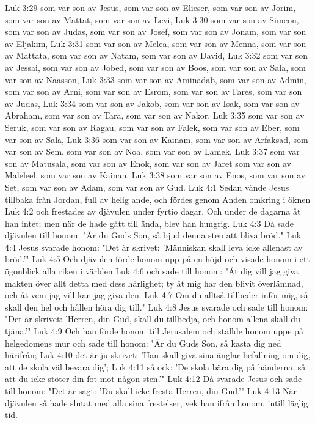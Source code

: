 Luk 3:29  som var son av Jesus, som var son av Elieser, som var son av Jorim, som var son av Mattat, som var son av Levi,
Luk 3:30  som var son av Simeon, som var son av Judas, som var son av Josef, som var son av Jonam, som var son av Eljakim,
Luk 3:31  som var son av Melea, som var son av Menna, som var son av Mattata, som var son av Natam, som var son av David,
Luk 3:32  som var son av Jessai, som var son av Jobed, som var son av Boos, som var son av Sala, som var son av Naasson,
Luk 3:33  som var son av Aminadab, som var son av Admin, som var son av Arni, som var son av Esrom, som var son av Fares, som var son av Judas,
Luk 3:34  som var son av Jakob, som var son av Isak, som var son av Abraham, som var son av Tara, som var son av Nakor,
Luk 3:35  som var son av Seruk, som var son av Ragau, som var son av Falek, som var son av Eber, som var son av Sala,
Luk 3:36  som var son av Kainam, som var son av Arfaksad, som var son av Sem, som var son av Noa, som var son av Lamek,
Luk 3:37  som var son av Matusala, som var son av Enok, som var son av Jaret som var son av Maleleel, som var son av Kainan,
Luk 3:38  som var son av Enos, som var son av Set, som var son av Adam, som var son av Gud.
Luk 4:1  Sedan vände Jesus tillbaka från Jordan, full av helig ande, och fördes genom Anden omkring i öknen
Luk 4:2  och frestades av djävulen under fyrtio dagar. Och under de dagarna åt han intet; men när de hade gått till ända, blev han hungrig.
Luk 4:3  Då sade djävulen till honom: "Är du Guds Son, så bjud denna sten att bliva bröd."
Luk 4:4  Jesus svarade honom: "Det är skrivet: 'Människan skall leva icke allenast av bröd.'"
Luk 4:5  Och djävulen förde honom upp på en höjd och visade honom i ett ögonblick alla riken i världen
Luk 4:6  och sade till honom: "Åt dig vill jag giva makten över allt detta med dess härlighet; ty åt mig har den blivit överlämnad, och åt vem jag vill kan jag giva den.
Luk 4:7  Om du alltså tillbeder inför mig, så skall den hel och hållen höra dig till."
Luk 4:8  Jesus svarade och sade till honom: "Det är skrivet: 'Herren, din Gud, skall du tillbedja, och honom allena skall du tjäna.'"
Luk 4:9  Och han förde honom till Jerusalem och ställde honom uppe på helgedomens mur och sade till honom: "Är du Guds Son, så kasta dig ned härifrån;
Luk 4:10  det är ju skrivet: 'Han skall giva sina änglar befallning om dig, att de skola väl bevara dig';
Luk 4:11  så ock: 'De skola bära dig på händerna, så att du icke stöter din fot mot någon sten.'"
Luk 4:12  Då svarade Jesus och sade till honom: "Det är sagt: 'Du skall icke fresta Herren, din Gud.'"
Luk 4:13  När djävulen så hade slutat med alla sina frestelser, vek han ifrån honom, intill läglig tid.
